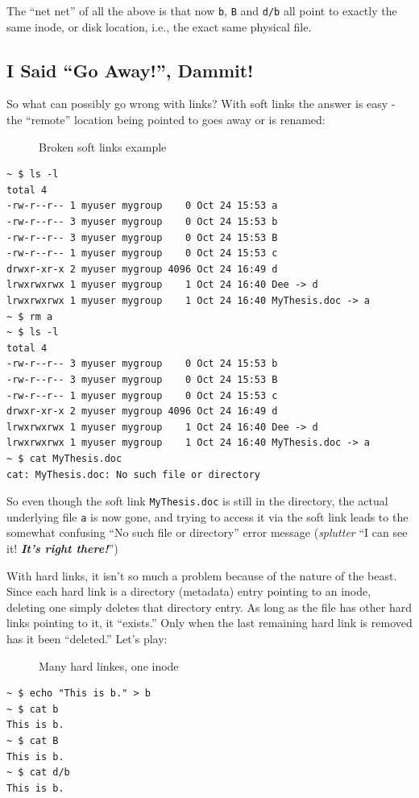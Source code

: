 \documentclass[10pt,]{book}
\numberwithin{figure}{chapter}
\DeclareRobustCommand{\drcap}[1]{\begin{figure}[H]\caption{#1}\end{figure}}
\begin{document}
The ``net net'' of all the above is that now \texttt{b}, \texttt{B} and
\texttt{d/b} all point to exactly the same inode, or disk location,
i.e., the exact same physical file.

\subsection{I Said ``Go Away!'', Dammit!}\label{i-said-go-away-dammit}

So what can possibly go wrong with links? With soft links the answer is
easy - the ``remote'' location being pointed to goes away or is renamed:

\drcap{Broken soft links example}

\begin{verbatim}
~ $ ls -l
total 4
-rw-r--r-- 1 myuser mygroup    0 Oct 24 15:53 a
-rw-r--r-- 3 myuser mygroup    0 Oct 24 15:53 b
-rw-r--r-- 3 myuser mygroup    0 Oct 24 15:53 B
-rw-r--r-- 1 myuser mygroup    0 Oct 24 15:53 c
drwxr-xr-x 2 myuser mygroup 4096 Oct 24 16:49 d
lrwxrwxrwx 1 myuser mygroup    1 Oct 24 16:40 Dee -> d
lrwxrwxrwx 1 myuser mygroup    1 Oct 24 16:40 MyThesis.doc -> a
~ $ rm a
~ $ ls -l
total 4
-rw-r--r-- 3 myuser mygroup    0 Oct 24 15:53 b
-rw-r--r-- 3 myuser mygroup    0 Oct 24 15:53 B
-rw-r--r-- 1 myuser mygroup    0 Oct 24 15:53 c
drwxr-xr-x 2 myuser mygroup 4096 Oct 24 16:49 d
lrwxrwxrwx 1 myuser mygroup    1 Oct 24 16:40 Dee -> d
lrwxrwxrwx 1 myuser mygroup    1 Oct 24 16:40 MyThesis.doc -> a
~ $ cat MyThesis.doc 
cat: MyThesis.doc: No such file or directory
\end{verbatim}

So even though the soft link \texttt{MyThesis.doc} is still in the
directory, the actual underlying file \texttt{a} is now gone, and trying
to access it via the soft link leads to the somewhat confusing ``No such
file or directory'' error message (\emph{splutter} ``I can see it!
\textbf{\emph{It's right there!}}'')

With hard links, it isn't so much a problem because of the nature of the
beast. Since each hard link is a directory (metadata) entry pointing to
an inode, deleting one simply deletes that directory entry. As long as
the file has other hard links pointing to it, it ``exists.'' Only when
the last remaining hard link is removed has it been ``deleted.'' Let's
play:

\drcap{Many hard linkes, one inode}

\begin{verbatim}
~ $ echo "This is b." > b
~ $ cat b
This is b.
~ $ cat B
This is b.
~ $ cat d/b
This is b.
\end{verbatim}
\end{document}
